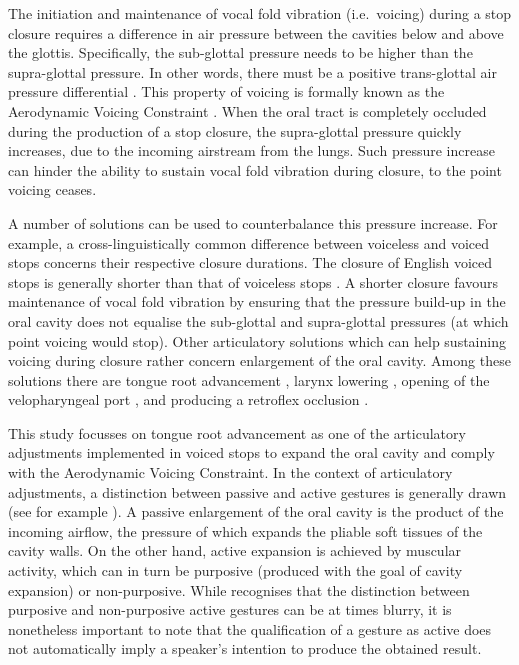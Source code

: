 \documentclass[preprint]{JASAnew}
\begin{document}
The initiation and maintenance of vocal fold vibration (i.e.~voicing)
during a stop closure requires a difference in air pressure between the
cavities below and above the glottis. Specifically, the sub-glottal
pressure needs to be higher than the supra-glottal pressure. In other
words, there must be a positive trans-glottal air pressure differential
\citep{berg1958, rothenberg1967}. This property of voicing is formally
known as the Aerodynamic Voicing Constraint \citep{ohala2011}. When the
oral tract is completely occluded during the production of a stop
closure, the supra-glottal pressure quickly increases, due to the
incoming airstream from the lungs. Such pressure increase can hinder the
ability to sustain vocal fold vibration during closure, to the point
voicing ceases.

A number of solutions can be used to counterbalance this pressure
increase. For example, a cross-linguistically common difference between
voiceless and voiced stops concerns their respective closure durations.
The closure of English voiced stops is generally shorter than that of
voiceless stops
\citep{lisker1957, umeda1977, van-summers1987, davis1989, de-jong1991}.
A shorter closure favours maintenance of vocal fold vibration by
ensuring that the pressure build-up in the oral cavity does not equalise
the sub-glottal and supra-glottal pressures (at which point voicing
would stop). Other articulatory solutions which can help sustaining
voicing during closure rather concern enlargement of the oral cavity.
Among these solutions there are tongue root advancement
\citep{kent1969, perkell1969, westbury1983, rothenberg1967, ahn2018},
larynx lowering \citep{riordan1980}, opening of the velopharyngeal port
\citep{yanagihara1966}, and producing a retroflex occlusion
\citep{sprouse2008}.

This study focusses on tongue root advancement as one of the
articulatory adjustments implemented in voiced stops to expand the oral
cavity and comply with the Aerodynamic Voicing Constraint. In the
context of articulatory adjustments, a distinction between passive and
active gestures is generally drawn (see for example
\citealt{rothenberg1967}). A passive enlargement of the oral cavity is
the product of the incoming airflow, the pressure of which expands the
pliable soft tissues of the cavity walls. On the other hand, active
expansion is achieved by muscular activity, which can in turn be
purposive (produced with the goal of cavity expansion) or non-purposive.
While \citet{rothenberg1967} recognises that the distinction between
purposive and non-purposive active gestures can be at times blurry, it
is nonetheless important to note that the qualification of a gesture as
active does not automatically imply a speaker's intention to produce the
obtained result.
\end{document}
